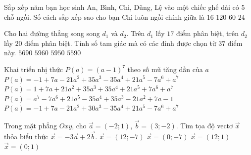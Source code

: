 \begin{ex}%
Sắp xếp năm bạn học sinh An, Bình, Chi, Dũng, Lệ vào một chiếc ghế dài có $5$ chỗ ngồi. Số cách sắp xếp sao cho bạn Chi luôn ngồi chính giữa là
\choice
{$16$}
{$120$}
{$60$}
{\True $24$}
\end{ex}

\begin{ex}%
Cho hai đường thẳng song song $d_1$ và $d_2.$ Trên $d_1$ lấy $17$ điểm phân biệt, trên $d_2$ lầy $20$ điểm phân biệt. Tính số tam giác mà có các đỉnh được chọn từ $37$ điểm này.
\choice
{$5690$}
{$5960$}
{\True $5950$}
{$5590$}
\end{ex}

\begin{ex}%
Khai triển nhị thức $P\left(a\right)=\left(a-1\right)^7$ theo số mũ tăng dần của $a$
\choice
{\True $P\left(a\right)=-1+7a-21a^2+35a^3-35a^4+21a^5-7a^6+a^7$}
{$P\left(a\right)=1+7a+21a^2+35a^3+35a^4+21a^5+7a^6+a^7$}
{$P\left(a\right)=a^7-7a^6+21a^5-35a^4+35a^3-21a^2+7a-1$}
{$P\left(a\right)=-1+7a-21a^2+30a^3-35a^4+21a^5-7a^6+a^7$}
\end{ex}

\begin{ex}%
Trong mặt phẳng $Oxy$, cho $\overrightarrow{a}=(-2; 1)$, $\overrightarrow{b}=(3;-2)$. Tìm tọa độ vectơ $\overrightarrow{x}$ thỏa biểu thức $\overrightarrow{x}=-3\overrightarrow{a}+2\overrightarrow{b}$.
\choice
{\True $\overrightarrow{x}=(12;-7)$}
{$\overrightarrow{x}=(0;-7)$}
{$\overrightarrow{x}=(12;1)$}
{$\overrightarrow{x}=(0;1)$}
\end{ex}

